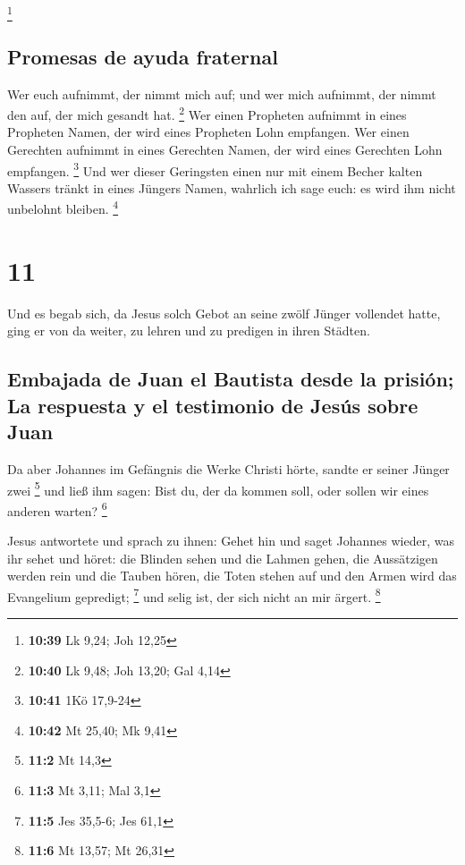 \footnote{\textbf{10:39} Lk 9,24; Joh 12,25}

\hypertarget{promesas-de-ayuda-fraternal}{%
\subsection{Promesas de ayuda
fraternal}\label{promesas-de-ayuda-fraternal}}

 Wer euch aufnimmt, der nimmt mich auf; und wer mich
aufnimmt, der nimmt den auf, der mich gesandt hat. \footnote{\textbf{10:40}
  Lk 9,48; Joh 13,20; Gal 4,14}  Wer einen Propheten
aufnimmt in eines Propheten Namen, der wird eines Propheten Lohn
empfangen. Wer einen Gerechten aufnimmt in eines Gerechten Namen, der
wird eines Gerechten Lohn empfangen. \footnote{\textbf{10:41} 1Kö
  17,9-24}  Und wer dieser Geringsten einen nur mit einem
Becher kalten Wassers tränkt in eines Jüngers Namen, wahrlich ich sage
euch: es wird ihm nicht unbelohnt bleiben. \footnote{\textbf{10:42} Mt
  25,40; Mk 9,41}

\hypertarget{section-10}{%
\section{11}\label{section-10}}

 Und es begab sich, da Jesus solch Gebot an seine zwölf
Jünger vollendet hatte, ging er von da weiter, zu lehren und zu predigen
in ihren Städten.

\hypertarget{embajada-de-juan-el-bautista-desde-la-prisiuxf3n-la-respuesta-y-el-testimonio-de-jesuxfas-sobre-juan}{%
\subsection{Embajada de Juan el Bautista desde la prisión; La respuesta
y el testimonio de Jesús sobre
Juan}\label{embajada-de-juan-el-bautista-desde-la-prisiuxf3n-la-respuesta-y-el-testimonio-de-jesuxfas-sobre-juan}}

 Da aber Johannes im Gefängnis die Werke Christi hörte,
sandte er seiner Jünger zwei \footnote{\textbf{11:2} Mt 14,3}
 und ließ ihm sagen: Bist du, der da kommen soll, oder
sollen wir eines anderen warten? \footnote{\textbf{11:3} Mt 3,11; Mal
  3,1}

 Jesus antwortete und sprach zu ihnen: Gehet hin und saget
Johannes wieder, was ihr sehet und höret:  die Blinden
sehen und die Lahmen gehen, die Aussätzigen werden rein und die Tauben
hören, die Toten stehen auf und den Armen wird das Evangelium gepredigt;
\footnote{\textbf{11:5} Jes 35,5-6; Jes 61,1}  und selig
ist, der sich nicht an mir ärgert. \footnote{\textbf{11:6} Mt 13,57; Mt
  26,31}

